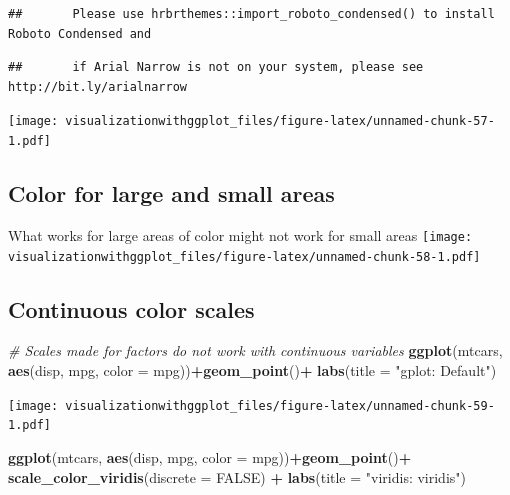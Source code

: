 \documentclass[]{krantz}
\makeatletter
\newenvironment{Shaded}{\begin{snugshade}}{\end{snugshade}}
\newcommand{\KeywordTok}[1]{\textcolor[rgb]{0.13,0.29,0.53}{\textbf{#1}}}
\newcommand{\DataTypeTok}[1]{\textcolor[rgb]{0.13,0.29,0.53}{#1}}
\newcommand{\StringTok}[1]{\textcolor[rgb]{0.31,0.60,0.02}{#1}}
\newcommand{\CommentTok}[1]{\textcolor[rgb]{0.56,0.35,0.01}{\textit{#1}}}
\newcommand{\OtherTok}[1]{\textcolor[rgb]{0.56,0.35,0.01}{#1}}
\newcommand{\OperatorTok}[1]{\textcolor[rgb]{0.81,0.36,0.00}{\textbf{#1}}}
\newcommand{\NormalTok}[1]{#1}
\newenvironment{kframe}{%
\medskip{}
\setlength{\fboxsep}{.8em}
 \def\at@end@of@kframe{}%
 \ifinner\ifhmode%
  \def\at@end@of@kframe{\end{minipage}}%
  \begin{minipage}{\columnwidth}%
 \fi\fi%
 \def\FrameCommand##1{\hskip\@totalleftmargin \hskip-\fboxsep
 \colorbox{shadecolor}{##1}\hskip-\fboxsep
     \hskip-\linewidth \hskip-\@totalleftmargin \hskip\columnwidth}%
 \MakeFramed {\advance\hsize-\width
   \@totalleftmargin\z@ \linewidth\hsize
   \@setminipage}}%
 {\par\unskip\endMakeFramed%
 \at@end@of@kframe}
\renewenvironment{Shaded}{\begin{kframe}}{\end{kframe}}
\theoremstyle{definition}
\theoremstyle{definition}
\theoremstyle{definition}
\theoremstyle{remark}
\makeatother
\begin{document}
\begin{verbatim}
##       Please use hrbrthemes::import_roboto_condensed() to install Roboto Condensed and
\end{verbatim}

\begin{verbatim}
##       if Arial Narrow is not on your system, please see http://bit.ly/arialnarrow
\end{verbatim}

\texttt{[image: visualizationwithggplot\_files/figure-latex/unnamed-chunk-57-1.pdf]}

\subsection{Color for large and small
areas}\label{color-for-large-and-small-areas}

What works for large areas of color might not work for small areas
\texttt{[image: visualizationwithggplot\_files/figure-latex/unnamed-chunk-58-1.pdf]}

\subsection{Continuous color scales}\label{continuous-color-scales}

\begin{Shaded}
\begin{Highlighting}[]
\CommentTok{# Scales made for factors do not work with continuous variables}
\KeywordTok{ggplot}\NormalTok{(mtcars, }\KeywordTok{aes}\NormalTok{(disp,  mpg, }\DataTypeTok{color =}\NormalTok{ mpg))}\OperatorTok{+}\KeywordTok{geom_point}\NormalTok{()}\OperatorTok{+}
\StringTok{  }\KeywordTok{labs}\NormalTok{(}\DataTypeTok{title =} \StringTok{"gplot: Default"}\NormalTok{)}
\end{Highlighting}
\end{Shaded}

\texttt{[image: visualizationwithggplot\_files/figure-latex/unnamed-chunk-59-1.pdf]}

\begin{Shaded}
\begin{Highlighting}[]
\KeywordTok{ggplot}\NormalTok{(mtcars, }\KeywordTok{aes}\NormalTok{(disp,  mpg, }\DataTypeTok{color =}\NormalTok{ mpg))}\OperatorTok{+}\KeywordTok{geom_point}\NormalTok{()}\OperatorTok{+}\StringTok{ }
\StringTok{  }\KeywordTok{scale_color_viridis}\NormalTok{(}\DataTypeTok{discrete =} \OtherTok{FALSE}\NormalTok{) }\OperatorTok{+}
\StringTok{  }\KeywordTok{labs}\NormalTok{(}\DataTypeTok{title =} \StringTok{"viridis: viridis"}\NormalTok{)}
\end{Highlighting}
\end{Shaded}
\end{document}
